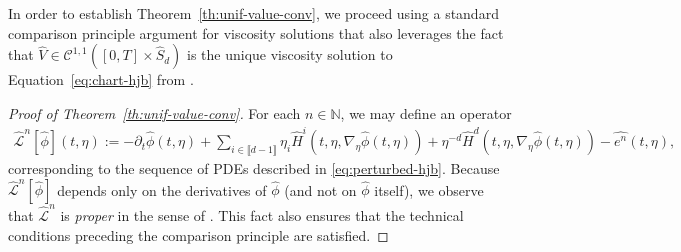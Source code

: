 \documentclass[11pt,reqno]{amsart}
\numberwithin{equation}{section}
\theoremstyle{plain}
\newcommand{\sC}{\mathcal{C}}
\newcommand{\sL}{\mathcal{L}}
\newcommand{\N}{\mathbb{N}}
\newcommand{\lbrs}[1]{\llbracket #1 \rrbracket}
\begin{document}
In order to establish Theorem~\ref{th:unif-value-conv}, we proceed using a standard comparison principle argument for viscosity solutions that also leverages the fact that $\widehat{V} \in \sC^{1,1}([0, T] \times \widehat{S}_d)$ is the unique viscosity solution to Equation~\eqref{eq:chart-hjb} from \cite{mfcp}.
\begin{proof}[Proof of Theorem~\ref{th:unif-value-conv}]
For each $n \in \N$, we may define an operator
\begin{align*}
    \widehat{\sL}^n[\widehat{\phi}](t, \eta) := -\partial_t \widehat{\phi}(t, \eta) + \sum_{i \in \lbrs{d-1}} \eta_i \widehat{H}^i(t, \eta, \nabla_\eta \widehat{\phi}(t,\eta)) + \eta^{-d} \widehat{H}^d(t, \eta, \nabla_\eta \widehat{\phi}(t,\eta)) - \widehat{e^n}(t,\eta),
\end{align*}
corresponding to the sequence of PDEs described in \eqref{eq:perturbed-hjb}. Because $\widehat{\sL}^n[\widehat{\phi}]$ depends only on the derivatives of $\widehat{\phi}$ (and not on $\widehat{\phi}$ itself), we observe that $\widehat{\sL}^n$ is \textit{proper} in the sense of \cite{visc-users}. This fact also ensures that the technical conditions preceding the comparison principle \cite[Theorem 3.3]{visc-users} are satisfied.


\end{proof}
\end{document}
